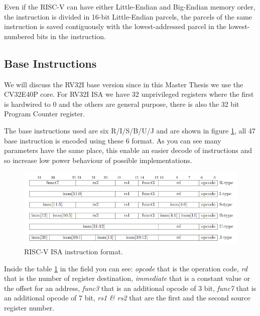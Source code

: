 {{		Even if the RISC-V can have either Little-Endian and Big-Endian memory order, the instruction is divided in 16-bit Little-Endian parcels, the parcels of the same instruction is saved contiguously with the lowest-addressed parcel in the lowest-numbered bits in the instruction.
		
		\subsection{Base Instructions}{
		    We will discuss the RV32I base version since in this Master Thesis we use the CV32E40P core.
		    For RV32I  ISA we have 32 unprivileged registers where the first is hardwired to 0 and the others are general purpose, there is also the 32 bit Program Counter register.
		    
		    The base instructions used are six R/I/S/B/U/J and are shown in figure \ref{fig:riscv_instruction_format}, all 47 base instruction is encoded using these 6 format.
		    As you can see many parameters have the same place, this enable an easier decode of instructions and so increase low power behaviour of possible implementations.
    	    \begin{figure}[H]
    			\centering
    			\includegraphics[scale=0.55,center]{./images/riscv_instruction_format.png}
    			\caption{RISC-V ISA instruction format.}
    			\label{fig:riscv_instruction_format}
    		\end{figure}
    		
    		Inside the table \ref{fig:riscv_instruction_format} in the field you can see: \textit{opcode} that is the operation code, \textit{rd} that is the number of register destination, \textit{immediate} that is a constant value or the offset for an address, \textit{func3} that is an additional opcode of 3 bit, \textit{func7} that is an additional opcode of 7 bit, \textit{rs1 \& rs2} that are the first and the second source register number.\\
		}%
		
}}
